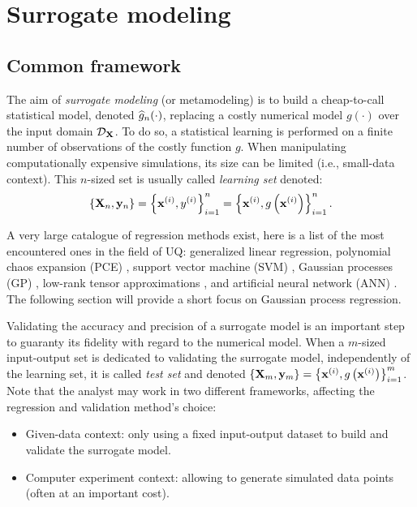 \section{Surrogate modeling} \label{sec:surrogate}

\subsection{Common framework}

The aim of \textit{surrogate modeling} (or metamodeling) is to build a cheap-to-call statistical model, denoted $\widehat{g}_n(\cdot)$, replacing a costly numerical model $g(\cdot)$ over the input domain $\mathcal{D}_{{\bf X}}$. 
To do so, a statistical learning is performed on a finite number of observations of the costly function $g$. 
When manipulating computationally expensive simulations, its size can be limited (i.e., small-data context). 
This $n$-sized set is usually called \textit{learning set} denoted: 
\begin{equation}
    \left\{{\bf X}_n, {\bf y}_n\right\} = \left\{{\bf x}^{(i)}, y^{(i)}\right\}_{i=1}^n
                                = \left\{{\bf x}^{(i)}, g\left({\bf x}^{(i)}\right)\right\}_{i=1}^n.    
\end{equation}

A very large catalogue of regression methods exist, here is a list of the most encountered ones in the field of UQ:
generalized linear regression, polynomial chaos expansion (PCE) \citep{soize_2004, blatman_2011}, support vector machine (SVM) \citep{vapnik_1995}, 
Gaussian processes (GP) \citep{rasmussen_2006}, low-rank tensor approximations \citep{grasedyck_2013}, and artificial neural network (ANN) \citep{tibshirani_2009}.
The following section will provide a short focus on Gaussian process regression. %

Validating the accuracy and precision of a surrogate model is an important step to guaranty its fidelity with regard to the numerical model. 
When a $m$-sized input-output set is dedicated to validating the surrogate model, independently of the learning set, 
it is called \textit{test set} and denoted $\left\{{\bf X}_m, {\bf y}_m\right\} = \left\{{\bf x}^{(i)}, g\left({\bf x}^{(i)}\right)\right\}_{i=1}^m$. 
Note that the analyst may work in two different frameworks, affecting the regression and validation method's choice: 
\begin{itemize}
    \item Given-data context: only using a fixed input-output dataset to build and validate the surrogate model. 
    \item Computer experiment context: allowing to generate simulated data points (often at an important cost).
\end{itemize}

